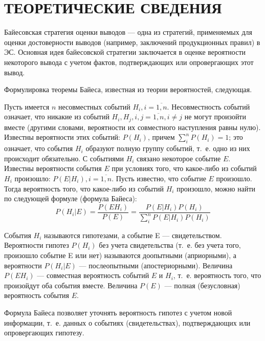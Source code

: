 \section{ТЕОРЕТИЧЕСКИЕ СВЕДЕНИЯ}

Байесовская стратегия оценки выводов --- одна из стратегий,
применяемых для оценки достоверности выводов
(например, заключений продукционных правил) в ЭС.
Основная идея байесовской стратегии заключается в оценке вероятности
некоторого вывода с учетом фактов, подтверждающих или опровергающих этот вывод.

Формулировка теоремы Байеса, известная из теории вероятностей, следующая.

Пусть имеется \( n \) несовместных событий \( H_i, i = \overline{1,n} \).
Несовместность событий означает, что никакие из событий \( H_i, H_j, i,j = \overline{1,n}, i \ne j \)
не могут произойти вместе (другими словами, вероятности их совместного наступления равны нулю).
Известны вероятности этих событий: \( P(H_i) \), причем \( \sum^n_i P(H_i) = 1 \);
это означает, что события \( H_i \) образуют  полную группу событий,
т.~е. одно из них происходит обязательно.
С событиями \( H_i \) связано некоторое событие \( E \).
Известны вероятности события \( E \) при условиях того, что какое-либо из событий
\( H_i \) произошло:
\( P(E | H_i), i = \overline{1,n} \).
Пусть известно, что событие \( E \) произошло.
Тогда вероятность того, что какое-либо из событий \( H_i \)
произошло, можно найти по следующей формуле (формула Байеса):
\begin{equation}
  \label{eq:bayes}
  P(H_i | E) = \dfrac{P(E H_i)}{P(E)} =  \dfrac{P(E | H_i) P(H_i)}{\sum^n_i P(E | H_i) P(H_i)}
\end{equation}

События \( H_i \) называются гипотезами, а событие E --- свидетельством.
Вероятности гипотез \( P(H_i) \) без учета свидетельства (т.~е. без учета того,
произошло событие E или нет) называются доопытными (априорными),
а вероятности \( P(H_i | E) \) --- послеопытными (апостериорными).
Величина \( P(E H_i) \) --- совместная вероятность событий \( E \) и \( H_i \),
т.~е. вероятность того, что произойдут оба события вместе.
Величина \( P(E) \) --- полная (безусловная) вероятность события \( E \).

Формула Байеса позволяет уточнять вероятность гипотез с учетом новой информации,
т.~е. данных о событиях (свидетельствах), подтверждающих или опровергающих гипотезу.
